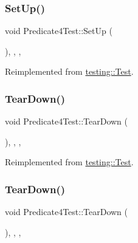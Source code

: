\mbox{\label{class_predicate4_test_ac27e833a2c7b3f889a01ad0a5bde18c6}} 
\subsubsection{\texorpdfstring{SetUp()}{SetUp()}\hspace{0.1cm}{\footnotesize\ttfamily [3/3]}}
{\footnotesize\ttfamily void Predicate4\+Test\+::\+Set\+Up (\begin{DoxyParamCaption}{ }\end{DoxyParamCaption})\hspace{0.3cm}{\ttfamily [inline]}, {\ttfamily [override]}, {\ttfamily [protected]}, {\ttfamily [virtual]}}



Reimplemented from \mbox{\hyperlink{classtesting_1_1_test_a190315150c303ddf801313fd1a777733}{testing\+::\+Test}}.

\mbox{\label{class_predicate4_test_ad1af4f8c283659c3af2c52a62de3435d}} 
\subsubsection{\texorpdfstring{TearDown()}{TearDown()}\hspace{0.1cm}{\footnotesize\ttfamily [1/3]}}
{\footnotesize\ttfamily void Predicate4\+Test\+::\+Tear\+Down (\begin{DoxyParamCaption}{ }\end{DoxyParamCaption})\hspace{0.3cm}{\ttfamily [inline]}, {\ttfamily [override]}, {\ttfamily [protected]}, {\ttfamily [virtual]}}



Reimplemented from \mbox{\hyperlink{classtesting_1_1_test_a5f0ab439802cbe0ef7552f1a9f791923}{testing\+::\+Test}}.

\mbox{\label{class_predicate4_test_ad1af4f8c283659c3af2c52a62de3435d}} 
\subsubsection{\texorpdfstring{TearDown()}{TearDown()}\hspace{0.1cm}{\footnotesize\ttfamily [2/3]}}
{\footnotesize\ttfamily void Predicate4\+Test\+::\+Tear\+Down (\begin{DoxyParamCaption}{ }\end{DoxyParamCaption})\hspace{0.3cm}{\ttfamily [inline]}, {\ttfamily [override]}, {\ttfamily [protected]}, {\ttfamily [virtual]}}



